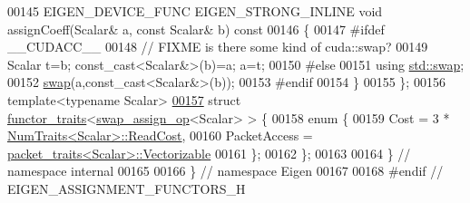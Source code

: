 \begin{DoxyCode}
00145   EIGEN\_DEVICE\_FUNC EIGEN\_STRONG\_INLINE \textcolor{keywordtype}{void} assignCoeff(Scalar& a, \textcolor{keyword}{const} Scalar& b)\textcolor{keyword}{ const}
00146 \textcolor{keyword}{  }\{
00147 \textcolor{preprocessor}{#ifdef \_\_CUDACC\_\_}
00148     \textcolor{comment}{// FIXME is there some kind of cuda::swap?}
00149     Scalar t=b; \textcolor{keyword}{const\_cast<}Scalar&\textcolor{keyword}{>}(b)=a; a=t;
00150 \textcolor{preprocessor}{#else}
00151     \textcolor{keyword}{using} \hyperlink{endian_8c_a3ca5ecd34b04d6a243c054ac3a57f68d}{std::swap};
00152     \hyperlink{endian_8c_a3ca5ecd34b04d6a243c054ac3a57f68d}{swap}(a,const\_cast<Scalar&>(b));
00153 \textcolor{preprocessor}{#endif}
00154   \}
00155 \};
00156 \textcolor{keyword}{template}<\textcolor{keyword}{typename} Scalar>
\hyperlink{struct_eigen_1_1internal_1_1functor__traits_3_01swap__assign__op_3_01_scalar_01_4_01_4}{00157} \textcolor{keyword}{struct }\hyperlink{struct_eigen_1_1internal_1_1functor__traits}{functor\_traits}<\hyperlink{struct_eigen_1_1internal_1_1swap__assign__op}{swap\_assign\_op}<Scalar> > \{
00158   \textcolor{keyword}{enum} \{
00159     Cost = 3 * \hyperlink{group___core___module_struct_eigen_1_1_num_traits}{NumTraits<Scalar>::ReadCost},
00160     PacketAccess = \hyperlink{struct_eigen_1_1internal_1_1packet__traits}{packet\_traits<Scalar>::Vectorizable}
00161   \};
00162 \};
00163 
00164 \} \textcolor{comment}{// namespace internal}
00165 
00166 \} \textcolor{comment}{// namespace Eigen}
00167 
00168 \textcolor{preprocessor}{#endif // EIGEN\_ASSIGNMENT\_FUNCTORS\_H}
\end{DoxyCode}
